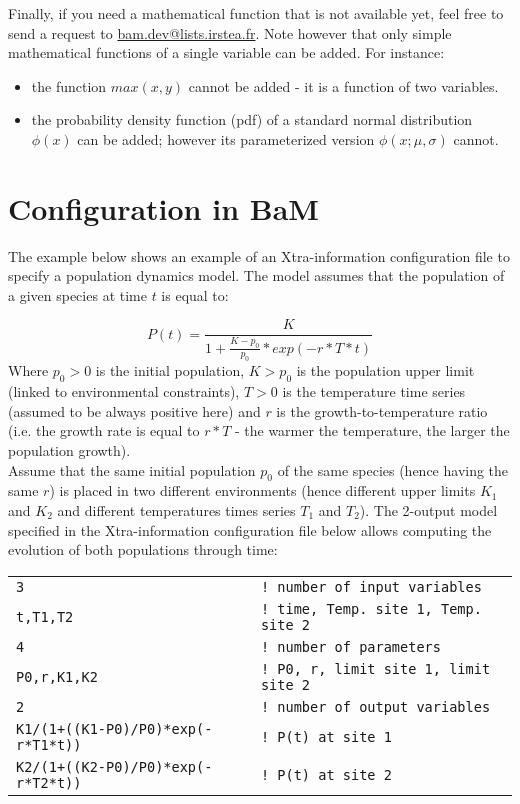 \documentclass[a4paper]{article}
\begin{document}
Finally, if you need a mathematical function that is not available yet, feel free to send a request to \href{mailto:bam.dev@lists.irstea.fr}{bam.dev@lists.irstea.fr}. Note however that only simple mathematical functions of a single variable can be added. For instance:

\begin{itemize}
\item the function $max(x,y)$ cannot be added - it is a function of two variables.
\item the probability density function (pdf) of a standard normal distribution $\phi(x)$ can be added; however its parameterized version $\phi(x;\mu,\sigma)$ cannot.  
\end{itemize}

\section{Configuration in BaM}
The example below shows an example of an Xtra-information configuration file to specify a population dynamics model. The model assumes that the population of a given species at time $t$ is equal to:

%
\begin{equation}
P(t)=\frac{K}{1+\frac{K-p_0}{p_0}*exp(-r*T*t)}
\label{eq:formula}
\end{equation}
%
Where $p_0>0$ is the initial population, $K>p_0$ is the population upper limit (linked to environmental constraints), $T>0$ is the temperature time series (assumed to be always positive here) and $r$ is the growth-to-temperature ratio (i.e. the growth rate is equal to $r*T$ - the warmer the temperature, the larger the population growth). \\
Assume that the same initial population $p_0$ of the same species (hence having the same $r$) is placed in two different environments (hence different upper limits $K_1$ and $K_2$ and different temperatures times series $T_1$ and $T_2$). The 2-output model specified in the Xtra-information configuration file below allows computing the evolution of both populations through time:\\

\begin{tcolorbox}
	\begin{tabular}{ll}
		\texttt{3} & \texttt{! number of input variables}\\
		\texttt{t,T1,T2} & \texttt{! time, Temp. site 1, Temp. site 2}\\
		\texttt{4} & \texttt{! number of parameters}\\
		\texttt{P0,r,K1,K2} & \texttt{! P0, r, limit site 1, limit site 2}\\
		\texttt{2} & \texttt{! number of output variables}\\
		\texttt{K1/(1+((K1-P0)/P0)*exp(-r*T1*t))} & \texttt{! P(t) at site 1}\\
		\texttt{K2/(1+((K2-P0)/P0)*exp(-r*T2*t))} & \texttt{! P(t) at site 2}\\
	\end{tabular}
\end{tcolorbox}
\end{document}
